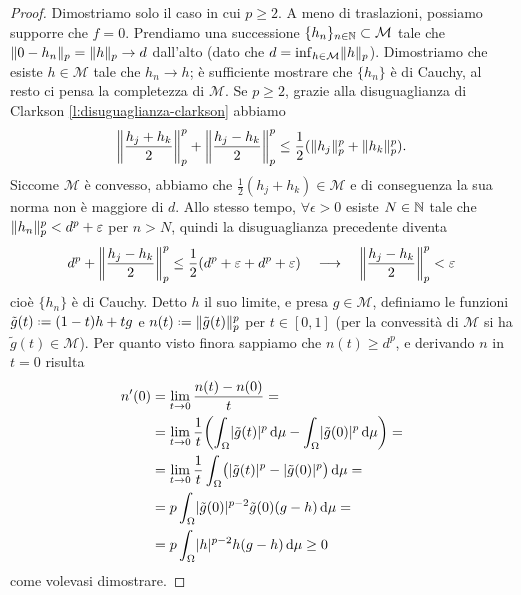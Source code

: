 \begin{proof}
    Dimostriamo solo il caso in cui $p\ge 2$.
    A meno di traslazioni, possiamo supporre che $f=0$.
    Prendiamo una successione $\{h_n\}_{n\in\N}\subset\mathcal{M}$ tale che $\norm{0-h_n}_p=\norm{h}_p\to d$ dall'alto (dato che $d=\inf_{h\in\mathcal{M}}\norm{h}_p$).
    Dimostriamo che esiste $h\in\mathcal{M}$ tale che $h_n\to h$; è sufficiente mostrare che $\{h_n\}$ è di Cauchy, al resto ci pensa la completezza di $\mathcal{M}$.
    Se $p\ge 2$, grazie alla disuguaglianza di Clarkson \ref{l:disuguaglianza-clarkson} abbiamo
    \begin{equation}
        \norm[\bigg]{\frac{h_j+h_k}2}_p^p+\norm[\bigg]{\frac{h_j-h_k}2}_p^p \le \frac12(\norm{h_j}_p^p+\norm{h_k}_p^p).
    \end{equation}
    Siccome $\mathcal{M}$ è convesso, abbiamo che $\frac12(h_j+h_k)\in\mathcal{M}$ e di conseguenza la sua norma non è maggiore di $d$.
    Allo stesso tempo, $\forall\epsilon>0$ esiste $N\in\N$ tale che $\norm{h_n}_p^p<d^p+\epsilon$ per $n>N$, quindi la disuguaglianza precedente diventa
    \begin{equation}
        d^p+\norm[\bigg]{\frac{h_j-h_k}2}_p^p \le \frac12(d^p+\epsilon+d^p+\epsilon)
        \qqq
        \norm[\bigg]{\frac{h_j-h_k}2}_p^p < \epsilon
    \end{equation}
    cioè $\{h_n\}$ è di Cauchy.
    Detto $h$ il suo limite, e presa $g\in\mathcal{M}$, definiamo le funzioni $\tilde{g}(t)\defeq(1-t)h+tg$ e $n(t)\defeq\norm{\tilde{g}(t)}_p^p$ per $t\in[0,1]$ (per la convessità di $\mathcal{M}$ si ha $\tilde{g}(t)\in\mathcal{M}$).
    Per quanto visto finora sappiamo che $n(t)\ge d^p$, e derivando $n$ in $t=0$ risulta
    \begin{equation}
        \begin{split}
            n'(0)&=
            \lim_{t\to 0}\frac{n(t)-n(0)}{t}=\\&=
            \lim_{t\to 0}\frac1{t}\biggl(\int_\Omega \abs{\tilde{g}(t)}^p\,\dd\mu-\int_\Omega \abs{\tilde{g}(0)}^p\,\dd\mu\biggr)=\\&=
            \lim_{t\to 0}\frac1{t}\int_\Omega\bigl(\abs{\tilde{g}(t)}^p-\abs{\tilde{g}(0)}^p\bigl)\,\dd\mu=\\&=
            p\int_\Omega\abs{\tilde{g}(0)}^{p-2}\tilde{g}(0)(g-h)\,\dd\mu=\\&=
            p\int_\Omega\abs{h}^{p-2}h(g-h)\,\dd\mu\ge
            0
        \end{split}
    \end{equation}
    come volevasi dimostrare.
\end{proof}
